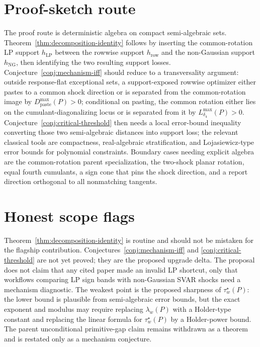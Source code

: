 \documentclass[11pt]{article}
\theoremstyle{definition}
\theoremstyle{plain}
\theoremstyle{remark}
\begin{document}
\section{Proof-sketch route}
The proof route is deterministic algebra on compact semi-algebraic sets.  Theorem~\ref{thm:decomposition-identity} follows by inserting the common-rotation LP support \(h_{\mathrm{LP}}\) between the rowwise support \(h_{\mathrm{row}}\) and the non-Gaussian support \(h_{\mathrm{NG}}\), then identifying the two resulting support losses.  Conjecture~\ref{conj:mechanism-iff} should reduce to a transversality argument: outside response-flat exceptional sets, a support-exposed rowwise optimizer either pastes to a common shock direction or is separated from the common-rotation image by \(D_{\mathrm{paste}}^{\max}(P)>0\); conditional on pasting, the common rotation either lies on the cumulant-diagonalizing locus or is separated from it by \(L_{\delta_4}^{\max}(P)>0\).  Conjecture~\ref{conj:critical-threshold} then needs a local error-bound inequality converting those two semi-algebraic distances into support loss; the relevant classical tools are compactness, real-algebraic stratification, and Lojasiewicz-type error bounds for polynomial constraints.  Boundary cases needing explicit algebra are the common-rotation parent specialization, the two-shock planar rotation, equal fourth cumulants, a sign cone that pins the shock direction, and a report direction orthogonal to all nonmatching tangents.

\section{Honest scope flags}
Theorem~\ref{thm:decomposition-identity} is routine and should not be mistaken for the flagship contribution.  Conjectures~\ref{conj:mechanism-iff} and \ref{conj:critical-threshold} are not yet proved; they are the proposed upgrade delta.  The proposal does not claim that any cited paper made an invalid LP shortcut, only that workflows comparing LP sign bands with non-Gaussian SVAR shocks need a mechanism diagnostic.  The weakest point is the proposed sharpness of \(\tau_w^\star(P)\): the lower bound is plausible from semi-algebraic error bounds, but the exact exponent and modulus may require replacing \(\lambda_w(P)\) with a Holder-type constant and replacing the linear formula for \(\tau_w^\star(P)\) by a Holder-power bound.  The parent unconditional primitive-gap claim remains withdrawn as a theorem and is restated only as a mechanism conjecture.
\end{document}
